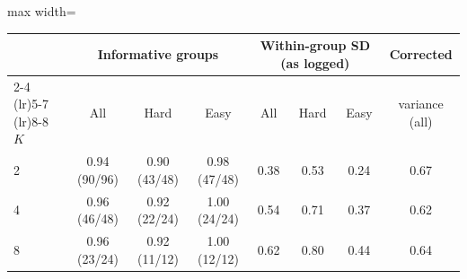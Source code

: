 \begin{adjustbox}{max width=\linewidth}
\begin{tabular}{lccccccc}
\toprule
 & \multicolumn{3}{c}{Informative groups} & \multicolumn{3}{c}{Within-group SD (as logged)} & Corrected \\
\cmidrule(lr){2-4} \cmidrule(lr){5-7} \cmidrule(lr){8-8}
$K$ & All & Hard & Easy & All & Hard & Easy & variance (all) \\
\midrule
2 & 0.94 (90/96) & 0.90 (43/48) & 0.98 (47/48) & 0.38 & 0.53 & 0.24 & 0.67 \\
4 & 0.96 (46/48) & 0.92 (22/24) & 1.00 (24/24) & 0.54 & 0.71 & 0.37 & 0.62 \\
8 & 0.96 (23/24) & 0.92 (11/12) & 1.00 (12/12) & 0.62 & 0.80 & 0.44 & 0.64 \\
\bottomrule
\end{tabular}
\end{adjustbox}
